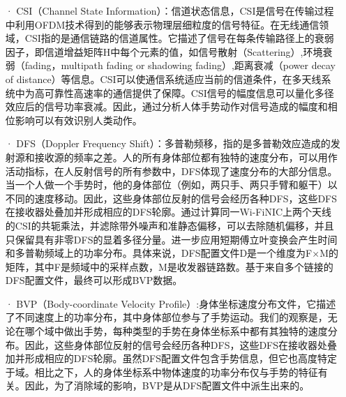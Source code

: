 \documentclass[a4paper]{article}
\begin{document}
    \begin{enumerate}
  \item[·] CSI（Channel State Information）：信道状态信息，CSI是信号在传输过程中利用OFDM技术得到的能够表示物理层细粒度的信号特征。在无线通信领域，CSI指的是通信链路的信道属性。它描述了信号在每条传输路径上的衰弱因子，即信道增益矩阵H中每个元素的值，如信号散射（Scattering）,环境衰弱（fading，multipath fading or shadowing fading）,距离衰减（power decay of distance）等信息。CSI可以使通信系统适应当前的信道条件，在多天线系统中为高可靠性高速率的通信提供了保障。CSI信号的幅度信息可以量化多径效应后的信号功率衰减。因此，通过分析人体手势动作对信号造成的幅度和相位影响可以有效识别人类动作。
  \item[·] DFS（Doppler Frequency Shift）：多普勒频移，指的是多普勒效应造成的发射源和接收源的频率之差。人的所有身体部位都有独特的速度分布，可以用作活动指标，在人反射信号的所有参数中，DFS体现了速度分布的大部分信息。当一个人做一个手势时，他的身体部位（例如，两只手、两只手臂和躯干）以不同的速度移动。因此，这些身体部位反射的信号会经历各种DFS，这些DFS在接收器处叠加并形成相应的DFS轮廓。通过计算同一Wi-FiNIC上两个天线的CSI的共轭乘法，并滤除带外噪声和准静态偏移，可以去除随机偏移，并且只保留具有非零DFS的显着多径分量。进一步应用短期傅立叶变换会产生时间和多普勒频域上的功率分布。具体来说，DFS配置文件D是一个维度为F×M的矩阵，其中F是频域中的采样点数，M是收发器链路数。基于来自多个链接的DFS配置文件，最终可以形成BVP数据。
  \item[·] BVP（Body-coordinate Velocity Profile）:身体坐标速度分布文件，它描述了不同速度上的功率分布，其中身体部位参与了手势运动。我们的观察是，无论在哪个域中做出手势，每种类型的手势在身体坐标系中都有其独特的速度分布。因此，这些身体部位反射的信号会经历各种DFS，这些DFS在接收器处叠加并形成相应的DFS轮廓。虽然DFS配置文件包含手势信息，但它也高度特定于域。相比之下，人的身体坐标系中物体速度的功率分布仅与手势的特征有关。因此，为了消除域的影响，BVP是从DFS配置文件中派生出来的。
  \end{enumerate}
\end{document}
